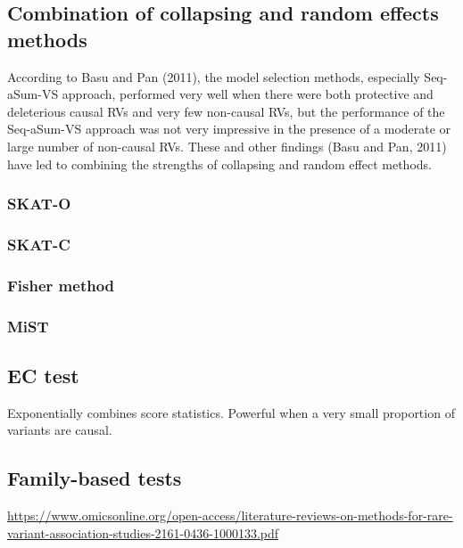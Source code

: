 \documentclass[]{book}
\theoremstyle{definition}
\theoremstyle{definition}
\theoremstyle{definition}
\theoremstyle{remark}
\begin{document}
\subsection{Combination of collapsing and random effects
methods}\label{combination-of-collapsing-and-random-effects-methods}

According to Basu and Pan (2011), the model selection methods,
especially Seq-aSum-VS approach, performed very well when there were
both protective and deleterious causal RVs and very few non-causal RVs,
but the performance of the Seq-aSum-VS approach was not very impressive
in the presence of a moderate or large number of non-causal RVs. These
and other ﬁndings (Basu and Pan, 2011) have led to combining the
strengths of collapsing and random eﬀect methods.

\subsubsection{SKAT-O}\label{skat-o}

\subsubsection{SKAT-C}\label{skat-c}

\subsubsection{Fisher method}\label{fisher-method}

\subsubsection{MiST}\label{mist}

\subsection{EC test}\label{ec-test}

Exponentially combines score statistics. Powerful when a very small
proportion of variants are causal.

\subsection{Family-based tests}\label{family-based-tests}

\url{https://www.omicsonline.org/open-access/literature-reviews-on-methods-for-rare-variant-association-studies-2161-0436-1000133.pdf}
\end{document}
